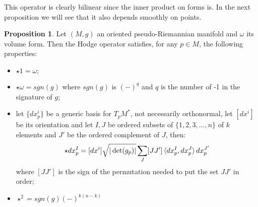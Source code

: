 \documentclass[12pt,a4paper]{report}
\theoremstyle{definition}
\theoremstyle{Theorem}
\newtheorem{Prop}[Def]{Proposition}
\theoremstyle{definition}
\theoremstyle{definition}
\begin{document}
	This operator is clearly bilinear since the inner product on forms is. In the next proposition we will see that it also depends smoothly on points.
	\begin{Prop}\label{Prop_1.7.2}
		Let $(M,g)$ an oriented pseudo-Riemannian manifold and $\omega$ its volume form. Then the Hodge operator satisfies, for any $p\in M$, the following properties:
		\begin{itemize}
			\item $\star 1=\omega;$
			\item $\star\omega=sgn(g)$ where $sgn(g)$ is $(-)^q$ and $q$ is the number of -1 in the signature of $g$;
			\item let $\{dx^i_p\}$ be a generic basis for $T_pM^*$, not necessarily orthonormal, let $[dx^i]$ be its orientation and let $I,J$ be ordered subsets of $\{1,2,3,...,n\}$ of $k$ elements and $J'$ be the ordered complement of $J$, then:
			$$\star dx_p^I=[dx^i]\sqrt{|\det(g_p)|}\sum_J[JJ']\braket{dx_p^I,dx_p^J}dx_p^{J'}$$
			where $[JJ']$ is the sign of the permutation needed to put the set $JJ'$ in order;
			\item $\star^2=sgn(g)(-)^{k(n-k)}$
		\end{itemize}
	\end{Prop}
\end{document}
